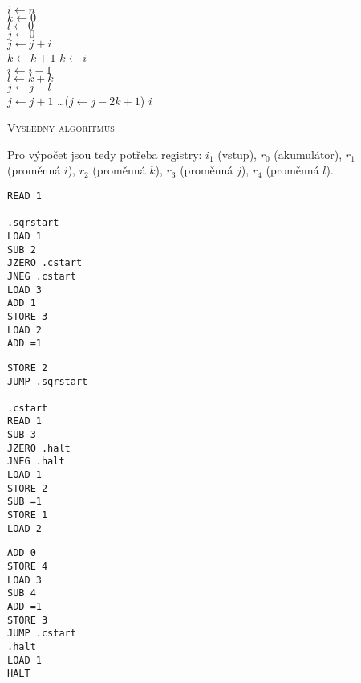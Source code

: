 \documentclass[a4paper,12pt]{article}
\begin{document}
\begin{enumerate}[label=\textbf{\arabic*}.]
  \begin{algorithm}[H]
 \SetNlSty{}{}{:}
 \SetNlSkip{-1.0em}
 \SetInd{0.5em}{0.5em}
 \BlankLine
 \Indentp{1.4em}
    $i \gets n$ \\
    $k \gets 0$ \\
    $l \gets 0$ \\
    $j \gets 0$ \\
     {
      $j \gets j + i$ \\
      $k \gets k + 1$
    }
     {
      $k \gets i$ \\
      $i \gets i - 1$ \\
      $l \gets k + k$ \\
      $j \gets j - l$  \\
      $j \gets j + 1$ \dots ($j \gets j - 2k + 1$)
    }
    \Return $i$
 \caption{\textsc{Výsledný algoritmus}}
 \end{algorithm}
 
 Pro výpočet jsou tedy potřeba registry: $i_1$ (vstup), $r_0$ (akumulátor), $r_1$ (proměnná $i$), 
 $r_2$ (proměnná $k$), $r_3$ (proměnná $j$), $r_4$ (proměnná $l$).

 \begin{center}
 \begin{minipage}[t]{.3\textwidth}
\begin{lstlisting}
READ 1

.sqrstart
LOAD 1
SUB 2
JZERO .cstart
JNEG .cstart
LOAD 3
ADD 1
STORE 3
LOAD 2
ADD =1
\end{lstlisting}%
\end{minipage}%
\hfill
\begin{minipage}[t]{.3\textwidth}
\begin{lstlisting}[firstnumber=13]
STORE 2
JUMP .sqrstart

.cstart
READ 1
SUB 3
JZERO .halt
JNEG .halt
LOAD 1
STORE 2
SUB =1
STORE 1
LOAD 2
\end{lstlisting}%
\end{minipage}%
\hfill
\begin{minipage}[t]{.3\textwidth}
\begin{lstlisting}[firstnumber=26]
ADD 0
STORE 4
LOAD 3
SUB 4
ADD =1
STORE 3
JUMP .cstart
.halt
LOAD 1
HALT
\end{lstlisting}%
\end{minipage}%
\end{center}


\end{enumerate}
\end{document}
